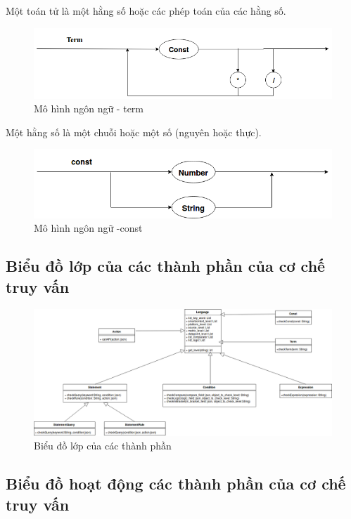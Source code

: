 Một toán tử là một hằng số hoặc các phép toán của các hằng số.
\begin{figure}[h!]
	\center
	\includegraphics[scale=0.4]{image/language_model-term}
	\caption{Mô hình ngôn ngữ - term}
\end{figure}

Một hằng số là một chuỗi hoặc một số (nguyên hoặc thực).
\begin{figure}[h!]
	\center
	\includegraphics[scale=0.4]{image/language_model-const}	
	\caption{Mô hình ngôn ngữ -const}
\end{figure}
\clearpage

\subsection{Biểu đồ lớp của các thành phần của cơ chế truy vấn}

\begin{figure}[h!]
	\center
	\includegraphics[scale=0.4]{image/language_diagram-class_diagram}	
	\caption{Biểu đồ lớp của các thành phần}
\end{figure}




\subsection{Biểu đồ hoạt động các thành phần của cơ chế truy vấn}

